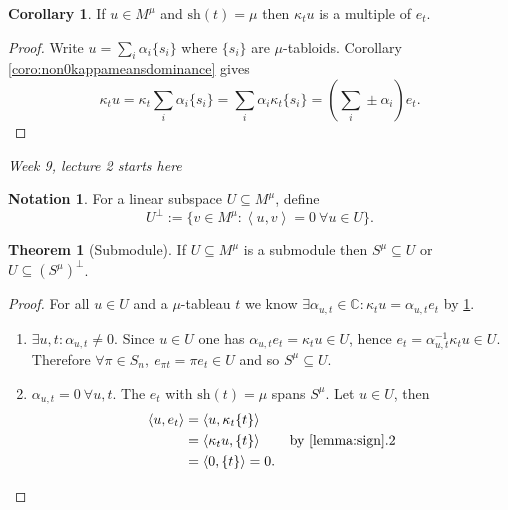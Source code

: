 \documentclass[a4paper]{article}
\newcommand{\la}{\left\langle}
\newcommand{\ra}{\right\rangle}
\newcommand{\C}{\mathbb{C}}
\newcommand{\sh}{\text{sh}}
\theoremstyle{definition}
\newtheorem{thm}[defn]{Theorem}
\newtheorem{coro}[defn]{Corollary}
\newtheorem*{notation}{Notation}
\begin{document}
\begin{coro}
\label{coro:kappatuismultofet}
If $u\in M^\mu$ and $\sh(t)=\mu$ then $\kappa_t u$ is a multiple of $e_t$.
\end{coro}
\begin{proof}
Write $u=\sum_i\alpha_i\{s_i\}$ where $\{s_i\}$ are $\mu$-tabloids. Corollary \ref{coro:non0kappameansdominance} gives
\[
\kappa_t u=\kappa_t \sum_i \alpha_i\{s_i\}=\sum_i\alpha_i\kappa_t\{s_i\}=\left(\sum_i\pm \alpha_i\right) e_t.
\]
\end{proof}

\begin{flushright}
\textit{Week 9, lecture 2 starts here}
\end{flushright}

\begin{notation}
For a linear subspace $U\subseteq M^\mu$, define
\[
U^\perp :=\{v\in M^\mu:\la u,v\ra=0 \ \forall u\in U\}.
\]
\end{notation}

\begin{thm}[Submodule]
\label{thm:submodule}
If $U\subseteq M^\mu$ is a submodule then $S^\mu\subseteq U$ or $U\subseteq (S^\mu)^\perp$.
\end{thm}
\begin{proof}
For all $u\in U$ and a $\mu$-tableau $t$ we know $\exists\alpha_{u,t}\in\C:\kappa_t u=\alpha_{u,t}e_t$ by \ref{coro:kappatuismultofet}.
\begin{enumerate}
\item[Case 1:] $\exists u,t:\alpha_{u,t}\neq 0$. Since $u\in U$ one has $\alpha_{u,t}e_t=\kappa_t u\in U$, hence $e_t=\alpha_{u,t}^{-1}\kappa_t u\in U$. Therefore $\forall\pi\in S_n,\ e_{\pi t}=\pi e_t\in U$ and so $S^\mu\subseteq U$.
\item[Case 2:] $\alpha_{u,t}=0 \ \forall u,t$. The $e_t$ with $\sh(t)=\mu$ spans $S^\mu$. Let $u\in U$, then
\[
\begin{aligned}
\la u,e_t\ra&=\la u,\kappa_t\{t\}\ra\\
&=\la\kappa_t u,\{t\}\ra \qquad \text{by \ref{lemma:sign}.2}\\
&=\la 0,\{t\}\ra=0.
\end{aligned}
\]
\end{enumerate}
\end{proof}
\end{document}
